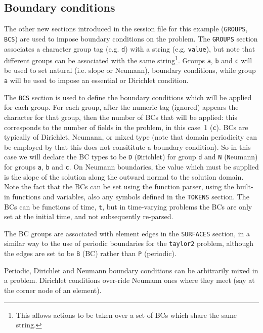 \documentclass[11pt,a4paper]{report}
\begin{document}
\subsection{Boundary conditions}

The other new sections introduced in the session file for this example
(\texttt{GROUPS}, \texttt{BCS}) are used to impose boundary conditions
on the problem.  The \texttt{GROUPS} section associates a character
group tag (e.g. \verb+d+) with a string (e.g. \verb+value+), but note
that different groups can be associated with the same
string\footnote{This allows actions to be taken over a set of BCs
which share the same string.}.  Groups \verb+a+, \verb+b+ and \verb+c+
will be used to set natural (i.e. slope or Neumann), boundary
conditions, while group \verb+a+ will be used to impose an essential
or Dirichlet condition.

The \texttt{BCS} section is used to define the boundary conditions
which will be applied for each group.  For each group, after the
numeric tag (ignored) appears the character for that group, then the
number of BCs that will be applied: this corresponds to the number of
fields in the problem, in this case~1 (\verb+c+).  BCs are typically
of Dirichlet, Neumann, or mixed type (note that domain periodicity can
be employed by that this does not consititute a boundary condition).
So in this case we will declare the BC types to be \verb+D+ ({\texttt
  D}irichlet) for group \verb+d+ and \verb+N+ ({\texttt N}eumann) for
groups \verb+a+, \verb+b+ and \verb+c+.  On Neumann boundaries, the
value which must be supplied is the slope of the solution along the
outward normal to the solution domain.  Note the fact that the BCs can
be set using the function parser, using the built-in functions and
variables, also any symbols defined in the \texttt{TOKENS} section.
The BCs can be functions of time, \verb+t+, but in time-varying
problems the BCs are only set at the initial time, and not
subsequently re-parsed.

The BC groups are associated with element edges in the \texttt{SURFACES}
section, in a similar way to the use of periodic boundaries for the
\texttt{taylor2} problem, although the edges are set to be \verb+B+ (BC)
rather than \verb+P+ (periodic).

Periodic, Dirichlet and Neumann boundary conditions can be arbitrarily
mixed in a problem.  Dirichlet conditions over-ride Neumann ones where
they meet (say at the corner node of an element).
\end{document}
